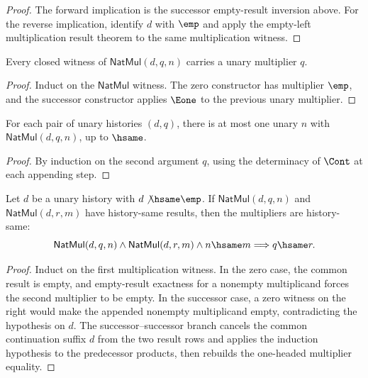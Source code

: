 \begin{proof}
The forward implication is the successor empty-result inversion above. For the
reverse implication, identify $d$ with $\emp$ and apply the empty-left
multiplication result theorem to the same multiplication witness.
\end{proof}
\begin{lemma}
\label{lem:nat-mul-right-unary}
Every closed witness of $\mathsf{NatMul}(d,q,n)$ carries a unary multiplier
$q$.
\end{lemma}
\begin{proof}
Induct on the $\mathsf{NatMul}$ witness. The zero constructor has multiplier
$\emp$, and the successor constructor applies $\Eone$ to the previous unary
multiplier.
\end{proof}
\begin{lemma}
\label{lem:nat-mul-functional}
For each pair of unary histories \((d, q)\), there is at most one unary \(n\) with \(\mathsf{NatMul}(d, q, n)\), up to \(\hsame\).
\end{lemma}
\begin{proof}
By induction on the second argument \(q\), using the determinacy of \(\Cont\) at each appending step.
\end{proof}
\begin{theorem}
\label{thm:natmul-nonempty-multiplicand-result-cancel}
Let $d$ be a unary history with $d\not\hsame\emp$. If
$\mathsf{NatMul}(d,q,n)$ and $\mathsf{NatMul}(d,r,m)$ have history-same
results, then the multipliers are history-same:
$$
\mathsf{NatMul}(d,q,n)\land\mathsf{NatMul}(d,r,m)\land n\hsame m
\Longrightarrow q\hsame r.
$$
\end{theorem}
\begin{proof}
Induct on the first multiplication witness. In the zero case, the common result
is empty, and empty-result exactness for a nonempty multiplicand forces the
second multiplier to be empty. In the successor case, a zero witness on the
right would make the appended nonempty multiplicand empty, contradicting the
hypothesis on $d$. The successor--successor branch cancels the common
continuation suffix $d$ from the two result rows and applies the induction
hypothesis to the predecessor products, then rebuilds the one-headed
multiplier equality.
\end{proof}

